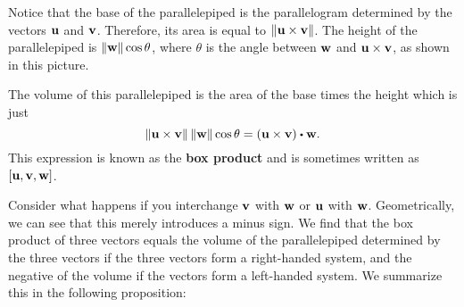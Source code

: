 Notice that the base of the parallelepiped is the parallelogram
determined by the vectors $\mbox{\bf u}$ and $\mbox{\bf v}$. Therefore, its
area is equal to $\left\|\mbox{\bf u}\times\mbox{\bf v}\right\|$. The height of the
parallelepiped is $\left\|\mbox{\bf w}\right\|\cos\theta$, where $\theta$ is the
angle between $\mbox{\bf w}$ and $\mbox{\bf u}\times\mbox{\bf v}$, as shown in
this picture.
\begin{center}
\end{center}
The volume of this parallelepiped is the area of the base times the
height which is just
\begin{equation*}
  \norm{\vect{u}\times \vect{v}} \norm{\vect{w}} \cos \theta =
  \tup{\vect{u}\times\vect{v}} \dotprod \vect{w}.
\end{equation*}
This expression is known as the
\textbf{box product} and is sometimes written as
$\left[\mbox{\bf u},\mbox{\bf v},\mbox{\bf w}\right]$.

Consider what happens if you interchange $\mbox{\bf v}$ with $\mbox{\bf w}$ or
$\mbox{\bf u}$ with $\mbox{\bf w}$.  Geometrically, we can see that this
merely introduces a minus sign. We find that the box product of three
vectors equals the volume of the parallelepiped determined by the
three vectors if the three vectors form a right-handed system, and the
negative of the volume if the vectors form a left-handed system.
We summarize this in the following proposition:

